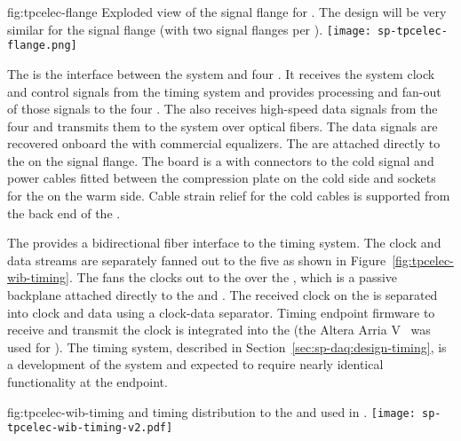\begin{dunefigure}
{fig:tpcelec-flange}
{Exploded view of the  signal flange for .  
The design will be very similar for the   
signal flange (with two  signal flanges per \fdth).}
\texttt{[image: sp-tpcelec-flange.png]}
\end{dunefigure}

The  is the interface between the  system and four
. It receives the system clock and control signals from the
timing system and provides processing and fan-out of those signals to the four
. The  also receives high-speed data signals from the four 
 and transmits them to the  system over optical
fibers. The data signals are recovered onboard the  with commercial 
equalizers. The  are attached directly to the 
 \fdth on the signal flange. The \fdth board is a  
with connectors to the cold signal and  power cables fitted
between the compression plate on the cold side and sockets for
the  on the warm side. Cable strain relief for the cold cables is 
supported from the back end of the \fdth.

The   provides a bidirectional fiber interface to the
timing system. The clock and data streams are separately fanned out to the 
five  as shown in Figure~\ref{fig:tpcelec-wib-timing}. The 
 fans the clocks out to the  over the , which is a 
passive backplane attached directly to the  and
.  The received clock on the  is separated into clock and
data using a clock-data separator. Timing endpoint firmware to receive and transmit
the clock is integrated into the   (the Altera 
Arria\texttrademark{} V~\cite{AlteraArria} was used for ). 
The  timing system, described in Section~\ref{sec:sp-daq:design-timing}, 
is a development of the  system and expected to require nearly identical 
functionality at the  endpoint.

\begin{dunefigure}
{fig:tpcelec-wib-timing}
{ and timing distribution to the  and  used in .}
\texttt{[image: sp-tpcelec-wib-timing-v2.pdf]}
\end{dunefigure}

